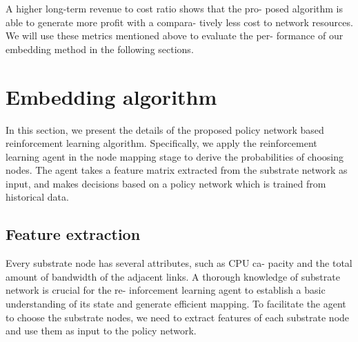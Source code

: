 \documentclass[12pt]{article}
\begin{document}
A higher long-term revenue to cost ratio shows that the pro-
posed algorithm is able to generate more profit with a compara-
tively less cost to network resources.
We will use these metrics mentioned above to evaluate the per-
formance of our embedding method in the following sections.

\section{Embedding algorithm}
In this section, we present the details of the proposed policy
network based reinforcement learning algorithm. Specifically, we
apply the reinforcement learning agent in the node mapping stage
to derive the probabilities of choosing nodes. The agent takes a
feature matrix extracted from the substrate network as input, and
makes decisions based on a policy network which is trained from
historical data.
\subsection{Feature extraction}
Every substrate node has several attributes, such as CPU ca-
pacity and the total amount of bandwidth of the adjacent links.
A thorough knowledge of substrate network is crucial for the re-
inforcement learning agent to establish a basic understanding of
its state and generate efficient mapping. To facilitate the agent to
choose the substrate nodes, we need to extract features of each
substrate node and use them as input to the policy network.
\end{document}
